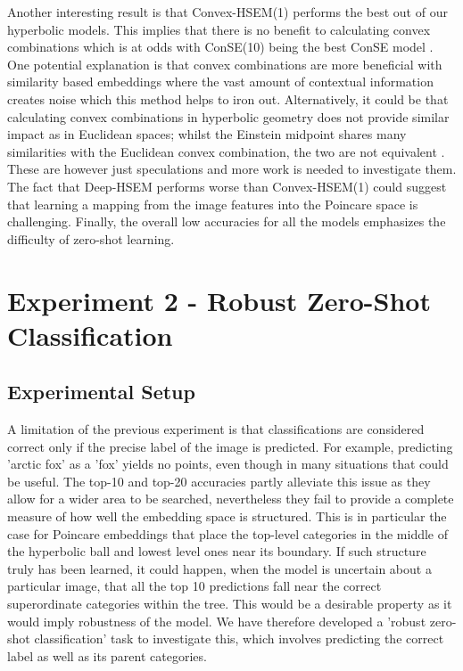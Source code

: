 \documentclass[12pt]{report}
\begin{document}
Another interesting result is that Convex-HSEM(1) performs the best out of our hyperbolic models. This implies that there is no benefit to calculating convex combinations which is at odds with ConSE(10) being the best ConSE model \cite{Norouzi2013}. One potential explanation is that convex combinations are more beneficial with similarity based embeddings where the vast amount of contextual information creates noise which this method helps to iron out. Alternatively, it could be that calculating convex combinations in hyperbolic geometry does not provide similar impact as in Euclidean spaces; whilst the Einstein midpoint shares many similarities with the Euclidean convex combination, the two are not equivalent \cite{Ungar2009}. These are however just speculations and more work is needed to investigate them. The fact that Deep-HSEM performs worse than Convex-HSEM(1) could suggest that learning a mapping from the image features into the Poincare space is challenging. Finally, the overall low accuracies for all the models emphasizes the difficulty of zero-shot learning.

\section{Experiment 2 - Robust Zero-Shot \\ Classification}
\subsection{Experimental Setup}
A limitation of the previous experiment is that classifications are considered correct only if the precise label of the image is predicted. For example, predicting 'arctic fox' as a 'fox' yields no points, even though in many situations that could be useful. The top-10 and top-20 accuracies partly alleviate this issue as they allow for a wider area to be searched, nevertheless they fail to provide a complete measure of how well the embedding space is structured. This is in particular the case for Poincare embeddings that place the top-level categories in the middle of the hyperbolic ball and lowest level ones near its boundary. If such structure truly has been learned, it could happen, when the model is uncertain about a particular image, that all the top 10 predictions fall near the correct superordinate categories within the tree. This would be a desirable property as it would imply robustness of the model. We have therefore developed a 'robust zero-shot classification' task to investigate this, which involves predicting the correct label as well as its parent categories.
\end{document}
